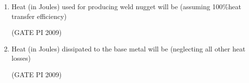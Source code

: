 \documentclass[journal,12pt,onecolumn]{IEEEtran}
\theoremstyle{remark}
\begin{document}
\begin{enumerate}
\item Heat (in Joules) used for producing weld nugget will be (assuming 100\%heat transfer efficiency)
\begin{enumerate}
\end{enumerate}

\hfill (GATE PI 2009)

\item Heat (in Joules) dissipated to the base metal will be (neglecting all other heat losses)
\begin{enumerate}
\end{enumerate}
\hfill (GATE PI 2009)

\end{enumerate}
\end{document}
